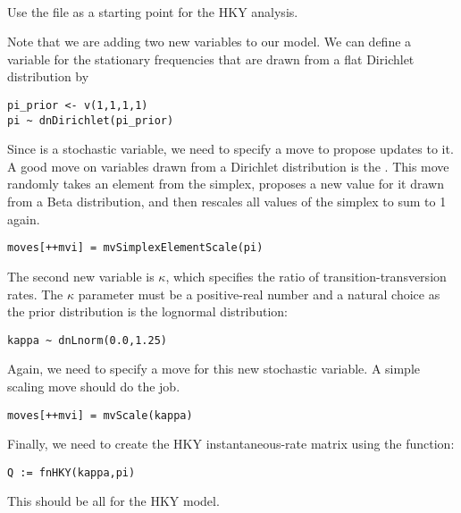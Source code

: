 \noindent \\ \impmark Use the file  as a starting point for the HKY analysis.

Note that we are adding two new variables to our model.
We can define a variable  for the stationary frequencies that are drawn from a flat Dirichlet distribution by
{\tt \begin{snugshade*}
\begin{lstlisting}
pi_prior <- v(1,1,1,1) 
pi ~ dnDirichlet(pi_prior)
\end{lstlisting}
\end{snugshade*}}
Since  is a stochastic variable, we need to specify a move to propose updates to it.
A good move on variables drawn from a Dirichlet distribution is the .
This move randomly takes an element from the simplex, proposes a new value for it drawn from a Beta distribution, and then rescales all values of the simplex to sum to 1 again.
{\tt \begin{snugshade*}
\begin{lstlisting}
moves[++mvi] = mvSimplexElementScale(pi)
\end{lstlisting}
\end{snugshade*}}

The second new variable is $\kappa$, which specifies the ratio of transition-transversion rates.
The $\kappa$ parameter must be a positive-real number and a natural choice as the prior distribution is the lognormal distribution:
{\tt \begin{snugshade*}
\begin{lstlisting}
kappa ~ dnLnorm(0.0,1.25)
\end{lstlisting}
\end{snugshade*}}
Again, we need to specify a move for this new stochastic variable.
A simple scaling move should do the job.
{\tt \begin{snugshade*}
\begin{lstlisting}
moves[++mvi] = mvScale(kappa)
\end{lstlisting}
\end{snugshade*}}

Finally, we need to create the HKY instantaneous-rate matrix using the  function:
{\tt \begin{snugshade*}
\begin{lstlisting}
Q := fnHKY(kappa,pi)
\end{lstlisting}
\end{snugshade*}}
This should be all for the HKY model.

